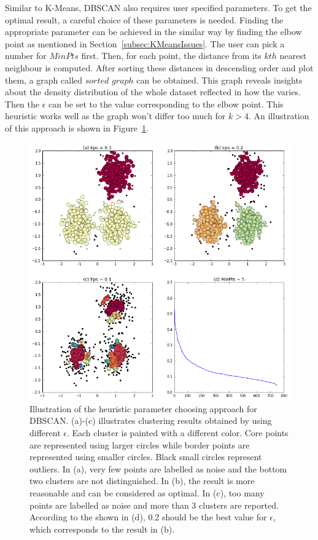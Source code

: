 Similar to K-Means, DBSCAN also requires user specified parameters. To get the optimal result, a careful choice of these parameters is needed. Finding the appropriate parameter can be achieved in the similar way by finding the elbow point as mentioned in Section~\ref{subsec:KMeansIssues}. The user can pick a number for $MinPts$ first. Then, for each point, the distance from its $kth$ nearest neighbour is computed. After sorting these distances in descending order and plot them, a graph called $sorted$  $graph$ can be obtained. This graph reveals insights about the density distribution of the whole dataset reflected in how the  varies. Then the $\epsilon$ can be set to the value corresponding to the elbow point. This heuristic works well as the graph won't differ too much for $k > 4$. An illustration of this approach is shown in Figure~\ref{fig:DBSCANParameter}.~\cite{ester1996density}

\begin{figure}
	\begin{center}
		\includegraphics[width=\textwidth]{images/DBSCANParameter.png}
		\caption{Illustration of the heuristic parameter choosing approach for DBSCAN. (a)-(c) illustrates clustering results obtained by using different $\epsilon$. Each cluster is painted with a different color. Core points are represented using larger circles while border points are represented using smaller circles. Black small circles represent outliers. In (a), very few points are labelled as noise and the bottom two clusters are not distinguished. In (b), the result is more reasonable and can be considered as optimal. In (c), too many points are labelled as noise and more than 3 clusters are reported. According to the  shown in (d), 0.2 should be the best value for $\epsilon$, which corresponds to the result in (b).}
		\label{fig:DBSCANParameter}
	\end{center}
\end{figure}